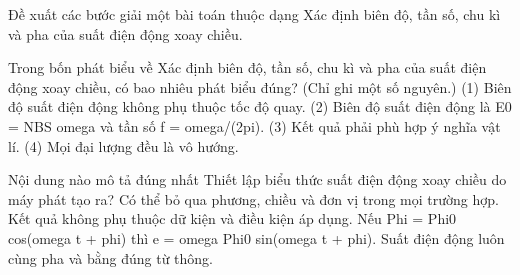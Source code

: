 \begin{bt}
Đề xuất các bước giải một bài toán thuộc dạng Xác định biên độ, tần số, chu kì và pha của suất điện động xoay chiều.
\end{bt}

\begin{ex}
Trong bốn phát biểu về Xác định biên độ, tần số, chu kì và pha của suất điện động xoay chiều, có bao nhiêu phát biểu đúng? (Chỉ ghi một số nguyên.) (1) Biên độ suất điện động không phụ thuộc tốc độ quay. (2) Biên độ suất điện động là E0 = NBS omega và tần số f = omega/(2pi). (3) Kết quả phải phù hợp ý nghĩa vật lí. (4) Mọi đại lượng đều là vô hướng.
\end{ex}

\begin{ex}
Nội dung nào mô tả đúng nhất Thiết lập biểu thức suất điện động xoay chiều do máy phát tạo ra?
\choice
{Có thể bỏ qua phương, chiều và đơn vị trong mọi trường hợp.}
{Kết quả không phụ thuộc dữ kiện và điều kiện áp dụng.}
{\True Nếu Phi = Phi0 cos(omega t + phi) thì e = omega Phi0 sin(omega t + phi).}
{Suất điện động luôn cùng pha và bằng đúng từ thông.}
\end{ex}

